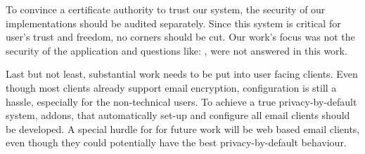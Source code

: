 To convince a certificate authority to trust our system, the security of our implementations should be audited
separately.
Since this system is critical for user's trust and freedom, no corners should be cut.
Our work's focus was not the security of the application and questions like: , were not answered in this work.

Last but not least, substantial work needs to be put into user facing clients.
Even though most clients already support email encryption, configuration is still a hassle, especially for the
non-technical users.
To achieve a true privacy-by-default system, addons, that automatically set-up and configure all email clients should be
developed.
A special hurdle for for future work will be web based email clients, even though they could potentially have the best
privacy-by-default behaviour.

